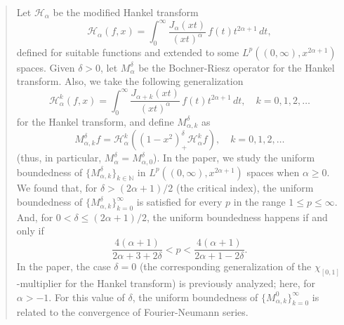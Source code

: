 \documentclass{amsart}
\theoremstyle{remark}
\newcommand{\N}{\mathbb{N}}
\begin{document}
\begin{abstract}
Let $\mathcal{H}_{\alpha}$ be the modified Hankel transform
\begin{equation*}
    \mathcal{H}_{\alpha}(f,x) = \int_0^\infty
       \frac{J_\alpha(xt)}{(xt)^\alpha} \, f(t) t^{2\alpha+1} \, dt,
\end{equation*}
defined for suitable functions and extended to some
$L^p((0,\infty),x^{2\alpha+1})$ spaces. Given $\delta>0$, let
$M_{\alpha}^{\delta}$ be the Bochner-Riesz operator for the Hankel
transform. Also, we take the following generalization
\begin{equation*}
    \mathcal{H}_{\alpha}^k(f,x) = \int_0^\infty
        \frac{J_{\alpha+k}(xt)}{(xt)^\alpha} \, f(t) t^{2\alpha+1} \, dt,
    \quad k = 0,1,2,\dots
\end{equation*}
for the Hankel transform, and define $M_{\alpha,k}^{\delta}$ as
\begin{equation*}
    M_{\alpha,k}^{\delta} f = \mathcal{H}_{\alpha}^k \left(
       (1-x^2)^{\delta}_+ \mathcal{H}_{\alpha}^k f \right),
    \quad k = 0,1,2,\dots
\end{equation*}
(thus, in particular, $M_{\alpha}^{\delta} = M_{\alpha,0}^{\delta}$).
In the paper, we study the uniform boundedness of
$\{M_{\alpha,k}^{\delta}\}_{k\in\N}$
in $L^p((0,\infty),x^{2\alpha+1})$ spaces when $\alpha \ge 0$.
We found that, for $\delta > (2\alpha+1)/2$ (the critical index), the uniform
boundedness of $\{M_{\alpha,k}^{\delta}\}_{k=0}^\infty$ is satisfied for every
$p$ in the range $1 \le p \le \infty$. And, for $0 < \delta \le (2\alpha+1)/2$, the
uniform boundedness happens if and only if
\begin{equation*}
    \frac{4(\alpha+1)}{2\alpha+3+2\delta} < p
    < \frac{4(\alpha+1)}{2\alpha+1-2\delta}.
\end{equation*}
In the paper, the case $\delta = 0$ (the corresponding generalization of the
$\chi_{[0,1]}$-multiplier for the Hankel transform) is previously analyzed;
here, for $\alpha > -1$. For this value of $\delta$, the uniform boundedness
of $\{M_{\alpha,k}^0\}_{k=0}^\infty$ is related to the convergence of
Fourier-Neumann series.
\end{abstract}

\maketitle
\end{document}

